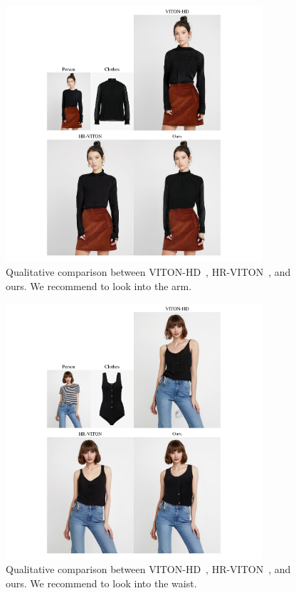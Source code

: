 \begin{figure}[t!]
    \centering
     \includegraphics[width=0.85\textwidth]{fig_supp/fig_suppl_HD_5.pdf}
     \caption{Qualitative comparison between VITON-HD~\cite{choi2021viton}, HR-VITON~\cite{lee2022hrviton}, and ours. We recommend to look into the arm.
     }
     \label{fig_supp_longsleeve_HR_5}
\end{figure}

\begin{figure}[t!]
    \centering
     \includegraphics[width=0.85\textwidth]{fig_supp/fig_suppl_HD_6.pdf}
     \caption{Qualitative comparison between VITON-HD~\cite{choi2021viton}, HR-VITON~\cite{lee2022hrviton}, and ours. We recommend to look into the waist.
     }
     \label{fig_supp_tucked_in_HR_6}
\end{figure}

